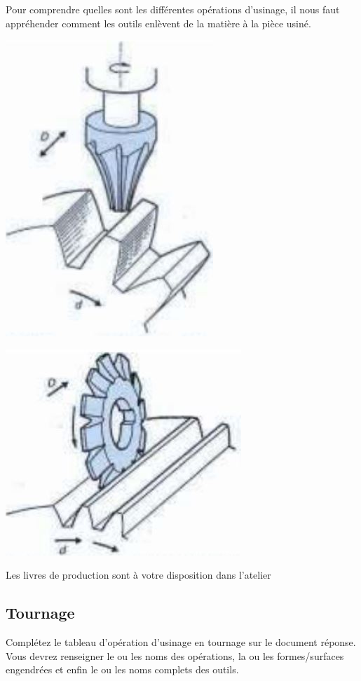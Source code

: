 \documentclass[12pt]{article}
\newcounter{exo}
\newenvironment{exo}{\stepcounter{exo}\vspace{0.5cm}{\bfseries Question \theexo\ :}}{\par\vspace{0.5cm}}
\begin{document}
Pour comprendre quelles sont les différentes opérations d'usinage, il nous faut appréhender comment les outils enlèvent de la matière à la pièce usiné.


\begin{minipage}[t]{.55\linewidth}
\includegraphics[width=0.5\linewidth]{Images/C1.JPG}
\end{minipage}
\begin{minipage}[t]{.44\linewidth}
\includegraphics[width=0.7\linewidth]{Images/C2.JPG}
\end{minipage}


\begin{tcolorbox}[colback=blue!5!white,colframe=red!75!black]
  \bcinfo Les livres de production sont à votre disposition dans l'atelier
\end{tcolorbox}


\subsection{Tournage}
\begin{exo} Complétez le tableau d'opération d'usinage en tournage sur le document réponse. Vous devrez renseigner le ou les noms des opérations, la ou les formes/surfaces engendrées et enfin le ou les noms complets des outils.  \end{exo}
\end{document}
